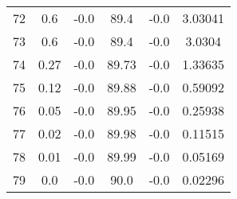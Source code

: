 \begin{center}
\begin{longtable}{c c c c c c}
    72 & 0.6 & -0.0 & 89.4 & -0.0 & 3.03041 \\
    73 & 0.6 & -0.0 & 89.4 & -0.0 & 3.0304 \\
    74 & 0.27 & -0.0 & 89.73 & -0.0 & 1.33635 \\
    75 & 0.12 & -0.0 & 89.88 & -0.0 & 0.59092 \\
    76 & 0.05 & -0.0 & 89.95 & -0.0 & 0.25938 \\
    77 & 0.02 & -0.0 & 89.98 & -0.0 & 0.11515 \\
    78 & 0.01 & -0.0 & 89.99 & -0.0 & 0.05169 \\
    79 & 0.0 & -0.0 & 90.0 & -0.0 & 0.02296 \\
    \hline
    \end{longtable}
\end{center}



